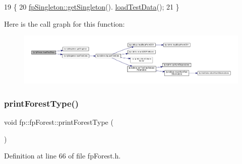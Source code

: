 \begin{DoxyCode}
19                                \{
20                 \hyperlink{classfp_1_1fpSingleton_a8bdae77b68521003e3fc630edec2e240}{fpSingleton::getSingleton}().
      \hyperlink{classfp_1_1fpSingleton_aea7c3b65ded387322d7d5ce48ab96215}{loadTestData}();
21             \}
\end{DoxyCode}
Here is the call graph for this function\+:
\nopagebreak
\begin{figure}[H]
\begin{center}
\leavevmode
\includegraphics[width=350pt]{classfp_1_1fpForest_abdcf008b65b6af7be5428d838b33be32_cgraph}
\end{center}
\end{figure}
\mbox{\label{classfp_1_1fpForest_a4a7ffa92224570d6a97eff8bd5e9b0fa}} 
\subsubsection{\texorpdfstring{print\+Forest\+Type()}{printForestType()}}
{\footnotesize\ttfamily void fp\+::fp\+Forest\+::print\+Forest\+Type (\begin{DoxyParamCaption}{ }\end{DoxyParamCaption})\hspace{0.3cm}{\ttfamily [inline]}}



Definition at line 66 of file fp\+Forest.\+h.


